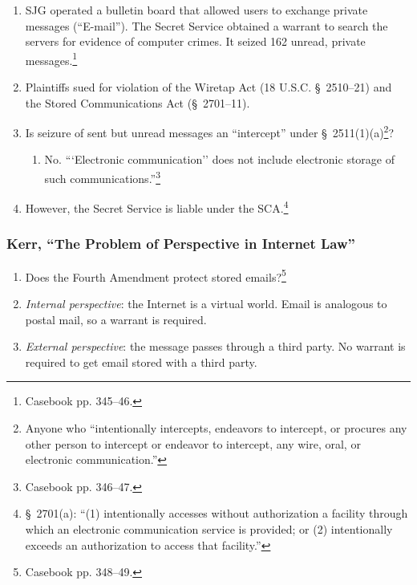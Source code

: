 \begin{enumerate}
    \item SJG operated a bulletin board that allowed users to exchange private 
    messages (``E-mail''). The Secret Service obtained a warrant to search the 
    servers for evidence of computer crimes. It seized 162 unread, private 
    messages.\footnote{Casebook pp. 345--46.}
    \item Plaintiffs sued for violation of the Wiretap Act (18 U.S.C. \S\ 
    2510--21) and the Stored Communications Act (\S\ 2701--11).
    \item Is seizure of sent but unread messages an ``intercept'' under \S\ 
    2511(1)(a)\footnote{Anyone who ``intentionally intercepts, endeavors to 
    intercept, or procures any other person to intercept or endeavor to 
    intercept, any wire, oral, or electronic communication.''}?
    \begin{enumerate}
        \item No. ```Electronic communication'' does not include electronic 
        storage of such communications.''\footnote{Casebook pp. 346--47.}
    \end{enumerate}
    \item However, the Secret Service is liable under the SCA.\footnote{\S\ 
    2701(a): ``(1) intentionally accesses without authorization a facility 
    through which an electronic communication service is provided; or (2) 
    intentionally exceeds an authorization to access that facility.''}
\end{enumerate}

\subsubsection{Kerr, ``The Problem of Perspective in Internet Law''}

\begin{enumerate}
    \item Does the Fourth Amendment protect stored emails?\footnote{Casebook 
    pp. 348--49.}
    \item \emph{Internal perspective}: the Internet is a virtual world. Email 
    is analogous to postal mail, so a warrant is required.
    \item \emph{External perspective}: the message passes through a third 
    party. No warrant is required to get email stored with a third party.
\end{enumerate}


